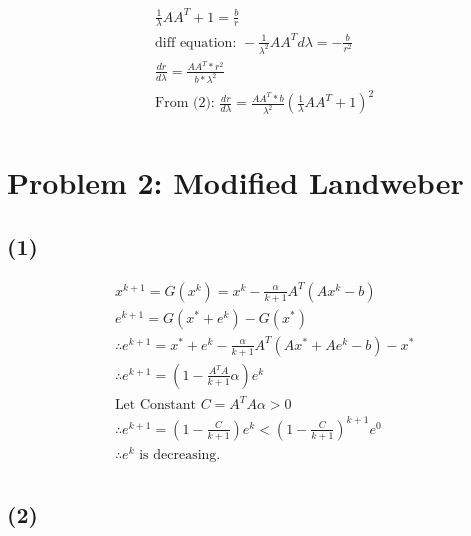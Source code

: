 \documentclass[a4paper]{article}
\begin{document}
\begin{align*}
& \frac{1}{\lambda}A A^T + 1 = \frac{b}{r} \\
& \text{diff equation: } -\frac{1}{\lambda^2} A A^T d\lambda = - \frac{b}{r^2} \\
& \frac{dr}{d\lambda} = \frac{A A^T * r^2}{b * \lambda^2} \\
& \text{From (2): } \frac{dr}{d\lambda} = \frac{A A^T * b}{\lambda^2} 
                    (\frac{1}{\lambda} A A^T + 1)^2\\
\end{align*}


\section*{Problem 2: Modified Landweber}

\subsection*{(1)}

\begin{align*}
    & x^{k+1} = G(x^k) = x^k - \frac{\alpha}{k+1}A^T(Ax^k-b) \\
    & e^{k+1} = G(x^* + e^k) - G(x^*) \\
    & \therefore e^{k+1} = x^* + e^k - \frac{\alpha}{k+1}A^T(Ax^* + Ae^k - b) - x^* \\
    & \therefore e^{k+1} = (1 - \frac{A^T A}{k+1} \alpha) e^k \\
    & \text{Let Constant } C = A^T A \alpha > 0 \\
    & \therefore e^{k+1} = (1 - \frac{C}{k+1}) e^k < (1 - \frac{C}{k+1})^{k+1} e^0 \\
    & \therefore e^k \text{ is decreasing.} \\
\end{align*}

\subsection*{(2)}
\end{document}
